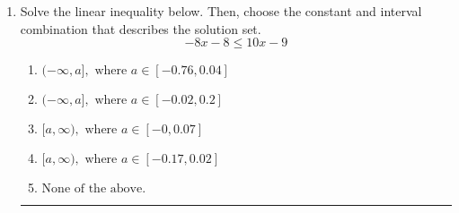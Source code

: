 \documentclass[14pt]{extbook}
\newcommand{\litem}[1]{\item#1\hspace*{-1cm}\rule{\textwidth}{0.4pt}}
\begin{document}
\begin{enumerate}
{\begin{enumerate}[label=\Alph*.]
\end{enumerate} }
\litem{
Solve the linear inequality below. Then, choose the constant and interval combination that describes the solution set.\[ -8x -8 \leq 10x -9 \]\begin{enumerate}[label=\Alph*.]
\item \( (-\infty, a], \text{ where } a \in [-0.76, 0.04] \)
\item \( (-\infty, a], \text{ where } a \in [-0.02, 0.2] \)
\item \( [a, \infty), \text{ where } a \in [-0, 0.07] \)
\item \( [a, \infty), \text{ where } a \in [-0.17, 0.02] \)
\item \( \text{None of the above}. \)

\end{enumerate} }
\end{enumerate}
\end{document}
